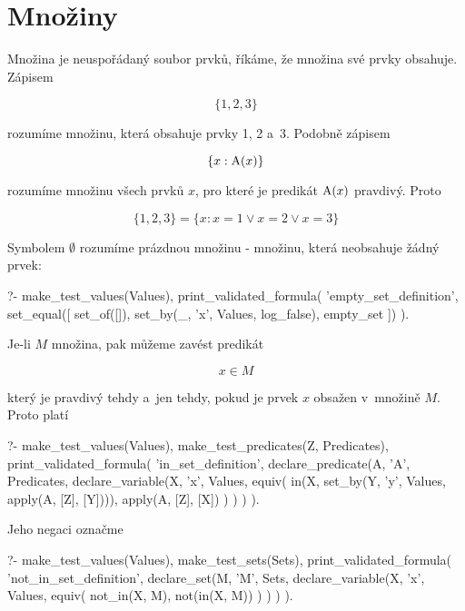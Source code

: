 \section{Množiny}

Množina je neuspořádaný soubor prvků, říkáme, že množina své prvky obsahuje. Zápisem

\begin{equation}
\{1, 2, 3\}
\end{equation}

rozumíme množinu, která obsahuje prvky 1, 2 a~3. Podobně zápisem

\begin{equation}
\{x: \mathrm{A}(x)\}
\end{equation}

rozumíme množinu všech prvků \(x\), pro které je predikát \(\mathrm{A}(x)\) pravdivý. Proto

\begin{equation}
\{1, 2, 3\} = \{x: x = 1 \lor x = 2 \lor x = 3\}
\end{equation}

Symbolem \(\emptyset\) rozumíme prázdnou množinu - množinu, která neobsahuje žádný prvek:

\begin{prolog}
?-	make_test_values(Values),
	print_validated_formula(
		'empty_set_definition',
		set_equal([
			set_of([]),
			set_by(_, 'x', Values, log_false),
			empty_set
		])
	).
\end{prolog}

Je-li \(M\) množina, pak můžeme zavést predikát

\begin{equation}
x \in M
\end{equation}

který je pravdivý tehdy a~jen tehdy, pokud je prvek \(x\) obsažen v~množině \(M\). Proto platí

\begin{prolog}
?-	make_test_values(Values),
	make_test_predicates(Z, Predicates),
	print_validated_formula(
		'in_set_definition',
		declare_predicate(A, 'A', Predicates,
			declare_variable(X, 'x', Values,
				equiv(
					in(X, set_by(Y, 'y', Values, apply(A, [Z], [Y]))),
					apply(A, [Z], [X])
				)
			)
		)
	).
\end{prolog}

Jeho negaci označme

\begin{prolog}
?- 	make_test_values(Values),
	make_test_sets(Sets),
	print_validated_formula(
		'not_in_set_definition',
		declare_set(M, 'M', Sets,
			declare_variable(X, 'x', Values,
				equiv(
					not_in(X, M),
					not(in(X, M))
				)
			)
		)
	).
\end{prolog}

